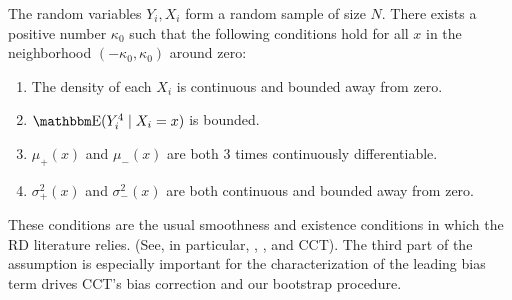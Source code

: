 \documentclass[12pt,fleqn]{article}
\begin{document}
\begin{assumption}\label{A1}
  The random variables $Y_i, X_i$ form a random sample of size $N$.
  There exists a positive number $\kappa_0$ such that the following
  conditions hold for all $x$ in the neighborhood $(-\kappa_{0},\kappa_{0})$
  around zero:
  \begin{enumerate}
  \item The density of each $X_i$ is continuous and bounded away from zero.
  \item $\E(Y_{i}^{4} \mid X_{i}=x)$ is bounded.
  \item $\mu_+(x)$ and $\mu_-(x)$ are both 3 times continuously differentiable.
  \item $\sigma_+^2(x)$ and $\sigma_-^2(x)$ are both continuous and bounded away
    from zero.
 \end{enumerate}
\end{assumption}

These conditions are the usual smoothness and existence conditions in which the
RD literature relies. (See, in particular, \citealp{HTV2001},
\citealp{Porter03}, and CCT). The third part of the assumption is especially
important for the characterization of the leading bias term drives CCT's bias
correction and our bootstrap procedure.
\end{document}
